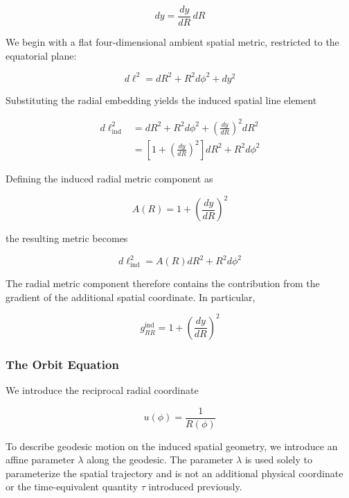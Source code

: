 \documentclass[pdflatex,sn-mathphys-num]{sn-jnl}%
\theoremstyle{thmstyleone}%
\theoremstyle{thmstyletwo}%
\theoremstyle{thmstylethree}%
\begin{document}
\begin{appendices}
\begin{equation}
    dy=\frac{dy}{dR}\,dR
\end{equation}

We begin with a flat four-dimensional ambient spatial metric, restricted to the equatorial plane:

\begin{equation}
    d\ell^2=dR^2+R^2d\phi^2+dy^2
\end{equation}

Substituting the radial embedding yields the induced spatial line element

\begin{align}
    d\ell_{\mathrm{ind}}^2
    &=
    dR^2+R^2d\phi^2
    +\left(\frac{dy}{dR}\right)^2dR^2 \\
    &=
    \left[
        1+\left(\frac{dy}{dR}\right)^2
    \right]dR^2
    +R^2d\phi^2
\end{align}

Defining the induced radial metric component as

\begin{equation}
    A(R)
    =
    1+\left(\frac{dy}{dR}\right)^2
\end{equation}

the resulting metric becomes

\begin{equation}
    \boxed{
    d\ell_{\mathrm{ind}}^2
    =
    A(R)dR^2+R^2d\phi^2
    }
\end{equation}

The radial metric component therefore contains the contribution from the gradient of the additional spatial coordinate. In particular,

\begin{equation}
    \boxed{
    g_{RR}^{\mathrm{ind}}
    =
    1+\left(\frac{dy}{dR}\right)^2
    }
\end{equation}


\subsubsection{The Orbit Equation}

We introduce the reciprocal radial coordinate

\begin{equation}
    u(\phi)=\frac{1}{R(\phi)}
\end{equation}

To describe geodesic motion on the induced spatial geometry, we introduce an affine parameter $\lambda$ along the geodesic. The parameter $\lambda$ is used solely to parameterize the spatial trajectory and is not an additional physical coordinate or the time-equivalent quantity $\tau$ introduced previously.


\end{appendices}
\end{document}
